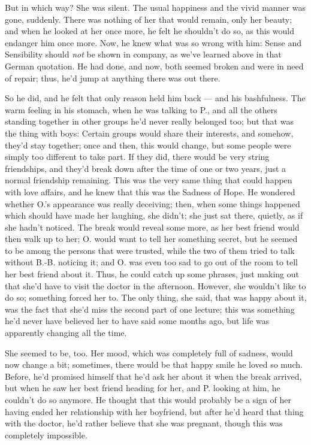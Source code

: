 But in which way? She was silent. The usual happiness and the vivid manner was gone, suddenly. There was nothing of her that would remain, only her beauty; and when he looked at her once more, he felt he shouldn't do so, as this would endanger him once more. Now, he knew what was so wrong with him: Sense and Sensibility should \emph{not} be shown in company, as we've learned above in that German quotation. He had done, and now, both seemed broken and were in need of repair; thus, he'd jump at anything there was out there.

So he did, and he felt that only reason held him back --- and his bashfulness. The warm feeling in his stomach, when he was talking to P., and all the others standing together in other groups he'd never really belonged too; but that was the thing with boys: Certain groups would share their interests, and somehow, they'd stay together; once and then, this would change, but some people were simply too different to take part. If they did, there would be very string friendships, and they'd break down after the time of one or two years, just a normal friendship remaining. This was the very same thing that could happen with love affairs, and he knew that this was the Sadness of Hope. He wondered whether O.'s appearance was really deceiving; then, when some things happened which should have made her laughing, she didn't; she just sat there, quietly, as if she hadn't noticed. The break would reveal some more, as her best friend would then walk up to her; O. would want to tell her something secret, but he seemed to be among the persons that were trusted, while the two of them tried to talk without B.-B. noticing it; and O. was even too sad to go out of the room to tell her best friend about it. Thus, he could catch up some phrases, just making out that she'd have to visit the doctor in the afternoon. However, she wouldn't like to do so; something forced her to. The only thing, she said, that was happy about it, was the fact that she'd miss the second part of one lecture; this was something he'd never have believed her to have said some months ago, but life was apparently changing all the time.

She seemed to be, too. Her mood, which was completely full of sadness, would now change a bit; sometimes, there would be that happy smile he loved so much. Before, he'd promised himself that he'd ask her about it when the break arrived, but when he saw her best friend heading for her, and P. looking at him, he couldn't do so anymore. He thought that this would probably be a sign of her having ended her relationship with her boyfriend, but after he'd heard that thing with the doctor, he'd rather believe that she was pregnant, though this was completely impossible.

